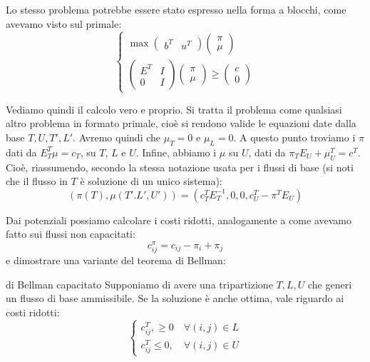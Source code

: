 \documentclass[a4paper,11pt]{article}
\begin{document}
Lo stesso problema potrebbe essere stato espresso nella forma a blocchi, come avevamo visto sul primale:
\[
	\begin{cases}
		\max 
		\begin{pmatrix}
			b^T & u^T
		\end{pmatrix}
		\begin{pmatrix}
			\pi \\ \mu
		\end{pmatrix}\\
		\begin{pmatrix}
			E^T & I \\ 
			0 & I
		\end{pmatrix}
		\begin{pmatrix}
			\pi \\ \mu
		\end{pmatrix}
			\geq
		\begin{pmatrix}
			c \\ 0
		\end{pmatrix}
	\end{cases}
\]

Vediamo quindi il calcolo vero e proprio.
Si tratta il problema come qualsiasi altro problema in formato primale, cioè si rendono valide le equazioni date dalla base $T, U, T', L'$.
Avremo quindi che $\mu_T = 0$ e $\mu_L = 0$.
A questo punto troviamo i $\pi$ dati da $E_T^T \mu = c_T$, su $T$, $L$ e $U$.
Infine, abbiamo i $\mu$ su $U$, dati da $\pi_T E_U + \mu_U^T = c^T$.
Cioè, riassumendo, secondo la stessa notazione usata per i flussi di base (si noti che il flusso in $T$ è soluzione di un unico sistema):
$$
(\pi(T), \mu(T'. L', U')) = \left(c_T^T E_T^{-1}, 0, 0, c_U^T - \pi^T E_U \right)
$$

Dai potenziali possiamo calcolare i costi ridotti, analogamente a come avevamo fatto sui flussi non capacitati:
$$
c^\pi_{ij} = c_{ij} - \pi_i + \pi_j
$$
e dimostrare una variante del teorema di Bellman:

\begin{theorem}{di Bellman capacitato}
	Supponiamo di avere una tripartizione $T, L, U$ che generi un flusso di base ammissibile.
	Se la soluzione è anche ottima, vale riguardo ai costi ridotti:
	\[
		\begin{cases}
			c_ {ij}^T, \geq 0 \quad \forall (i,j) \in L \\ 
			c_ {ij}^T \leq 0, \quad \forall (i,j) \in U
		\end{cases}
	\]	
\end{theorem}
\end{document}

